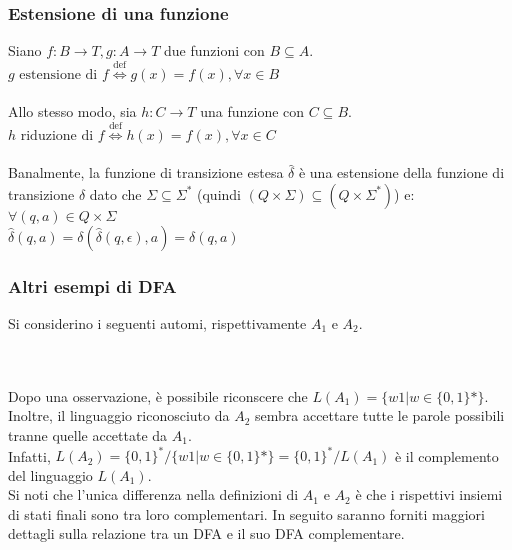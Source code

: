 \documentclass[]{article}
\begin{document}
\subsubsection{Estensione di una funzione}

Siano \mbox{$f \colon B \to T, g \colon A \to T$} due funzioni con \mbox{$ B \subseteq A $}.
\\
\mbox{$ g \text{ estensione di } f \overset{\text{def}}{\Leftrightarrow} g(x) = f(x), \forall x \in B $}
\\
\\
Allo stesso modo, sia \mbox{$h \colon C \to T$} una funzione con \mbox{$ C \subseteq B $}.
\\
\mbox{$ h \text{ riduzione di } f \overset{\text{def}}{\Leftrightarrow} h(x) = f(x), \forall x \in C $}
\\
\\
Banalmente, la funzione di transizione estesa \mbox{$ \hat\delta $} è una estensione della funzione di
transizione \mbox{$ \delta $} dato che \mbox{$ \Sigma \subseteq \Sigma^* $}
(quindi \mbox{$ (Q \times \Sigma) \subseteq (Q \times \Sigma^*) $}) e:
\\
\mbox{$ \forall (q, a) \in Q \times \Sigma $}
\\
\mbox{$ \hat\delta(q, a) = \delta(\hat\delta(q, \epsilon), a) = \delta(q, a) $}



\subsubsection{Altri esempi di DFA}

Si considerino i seguenti automi, rispettivamente \mbox{$A_1$} e \mbox{$A_2$}.
\\
\\
\\
Dopo una osservazione, è possibile riconscere che \mbox{$ L(A_1) = \{ w1 | w \in \{ 0, 1 \}* \} $}.
Inoltre, il linguaggio riconosciuto da \mbox{$A_2$} sembra accettare tutte le parole possibili tranne
quelle accettate da \mbox{$A_1$}.
\\
Infatti, \mbox{$ L(A_2) = \{ 0, 1 \}^* / \{ w1 | w \in \{ 0, 1 \}* \} = \{ 0, 1 \}^* / L(A_1) $} è il
complemento del linguaggio \mbox{$L(A_1)$}.
\\
Si noti che l'unica differenza nella definizioni di \mbox{$A_1$} e \mbox{$A_2$} è che i rispettivi
insiemi di stati finali sono tra loro complementari. In seguito saranno forniti maggiori dettagli sulla
relazione tra un DFA e il suo DFA complementare.
\end{document}
